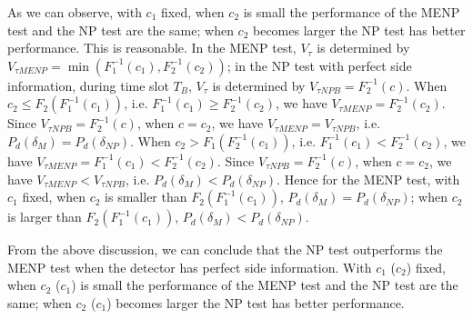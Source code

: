 As we can observe, with $c_1$  fixed, when $c_2$ is small the performance of the MENP test and the NP test are the same; when $c_2$ becomes larger the NP test has better performance. This is reasonable. In the MENP test, $V_\tau$ is determined by $V_{\tau MENP}= \min (F_1^{-1}(c_1), F_2^{-1}(c_2))$; in the NP test with perfect side information, during time slot $T_B$, $V_\tau$ is determined by $V_{\tau NP B} = F_2^{-1}(c)$. When $c_2 \leq F_2(F_1^{-1}(c_1))$, i.e. $F_1^{-1}(c_1) \geq  F_2^{-1}(c_2)$, we have  $V_{\tau MENP} = F_2^{-1}(c_2)$. Since $V_{\tau NP B} = F_2^{-1}(c)$, when $c = c_2$, we have $V_{\tau MENP} = V_{\tau NP B}$, i.e. $P_d(\delta_M) = P_d(\delta_{NP})$.    
When $c_2 > F_1(F_2^{-1}(c_1))$, i.e. $F_1^{-1}(c_1) < F_2^{-1}(c_2)$, we have  $V_{\tau MENP} = F_1^{-1}(c_1) < F_2^{-1}(c_2)$. Since $V_{\tau NP B} = F_2^{-1}(c)$, when $c = c_2$, we have  $V_{\tau MENP} < V_{\tau NP B}$, i.e.  $P_d(\delta_M) < P_d(\delta_{NP})$.
Hence for the MENP test, with $c_1$ fixed, when $c_2$ is smaller than $ F_2( F_1^{-1}(c_1)) $, $P_d(\delta_M) = P_d(\delta_{NP})$; when $c_2$ is larger than $ F_2( F_1^{-1}(c_1)) $, $P_d(\delta_M) < P_d(\delta_{NP})$. 

From the above discussion, we can conclude that the NP test outperforms the MENP test when the detector has perfect side information. With $c_1$ ($c_2$) fixed, when $c_2$ ($c_1$) is small the performance of the  MENP test and the NP test are the same; when $c_2$ ($c_1$) becomes larger the NP test has better performance.  
